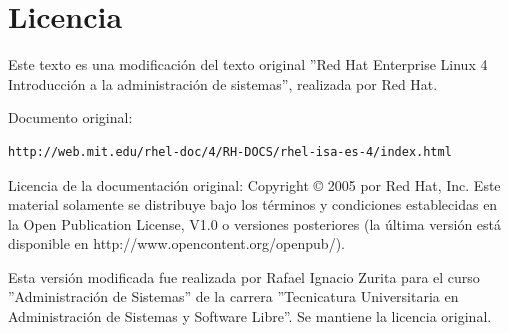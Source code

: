 \documentclass[12pt]{article}
\begin{document}
\section*{Licencia}

Este texto es una modificación del texto original 
''Red Hat Enterprise Linux 4
Introducción a la administración de sistemas'', realizada por Red Hat.

Documento original: 
\begin{verbatim}
http://web.mit.edu/rhel-doc/4/RH-DOCS/rhel-isa-es-4/index.html
\end{verbatim}

Licencia de la documentación original: 
Copyright © 2005 por Red Hat, Inc. Este material solamente se distribuye bajo los términos y condiciones establecidas en la Open Publication License, V1.0 o versiones posteriores (la última versión está disponible en http://www.opencontent.org/openpub/).

Esta versión modificada fue realizada por Rafael Ignacio Zurita para el curso ''Administración de Sistemas'' de la carrera
''Tecnicatura Universitaria en Administración de Sistemas y Software Libre''. Se mantiene la licencia original.
\end{document}
